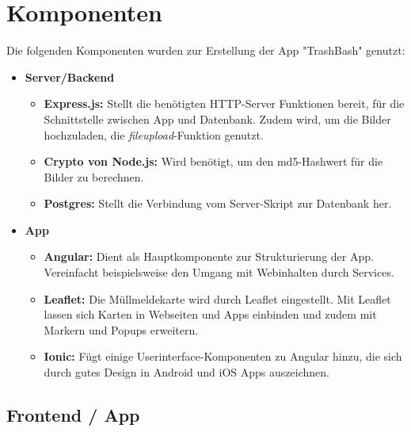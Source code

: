 \documentclass[a4paper, 11pt, DIV=11, listof=numbered, numbers=noenddot]{scrartcl}
\begin{document}
	\section{Komponenten}
	Die folgenden Komponenten wurden zur Erstellung der App "TrashBash" genutzt:
	\begin {itemize}
	\item \textbf{Server/Backend}
		\begin {itemize}
			\item \textbf{Express.js:} Stellt die benötigten HTTP-Server Funktionen bereit, für die Schnittstelle zwischen App und Datenbank. Zudem wird, um die Bilder hochzuladen, die \textit{fileupload}-Funktion genutzt.
			\item \textbf{Crypto von Node.js:} Wird benötigt, um den md5-Hashwert für die Bilder zu berechnen.
			\item \textbf{Postgres:} Stellt die Verbindung vom Server-Skript zur Datenbank her.
		\end {itemize}
	\item \textbf{App}
		\begin {itemize}
		\item \textbf{Angular:} Dient als Hauptkomponente zur Strukturierung der App. Vereinfacht beispielsweise den Umgang mit Webinhalten durch Services.
		\item \textbf{Leaflet:} Die Müllmeldekarte wird durch Leaflet eingestellt. Mit Leaflet lassen sich Karten in Webseiten und Apps einbinden und zudem mit Markern und Popups erweitern.
		\item \textbf{Ionic:} Fügt einige Userinterface-Komponenten zu Angular hinzu, die sich durch gutes Design in Android und iOS Apps auszeichnen.
		\end {itemize}
	\end {itemize}

	\subsection{Frontend / App}
\end{document}
